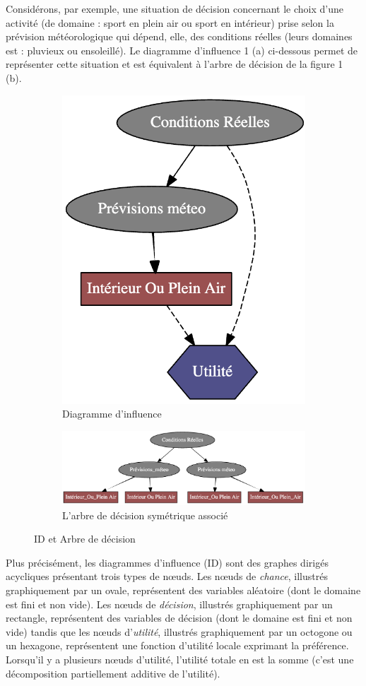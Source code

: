 \documentclass[12pt]{article}
\begin{document}
Considérons, par exemple, une situation de décision concernant le choix d'une activité (de domaine : sport en plein air ou sport en intérieur) prise selon la prévision météorologique qui dépend, elle, des conditions réelles (leurs domaines est : pluvieux ou ensoleillé). Le diagramme d'influence 1 (a) ci-dessous permet de représenter cette situation et est équivalent à l'arbre de décision de la figure 1 (b).

\begin{figure}[ht]
\centering
\begin{subfigure}{.5\textwidth}
  \centering
  \includegraphics[width=.5\linewidth]{docs/ressources_rapport/exempleID_SIMPLE.png}
  \caption{Diagramme d'influence}
  \label{fig:sub1}
\end{subfigure}%
\begin{subfigure}{.5\textwidth}
  \centering
  \includegraphics[width=1.2\linewidth]{docs/ressources_rapport/exempleArbreDecision.png}
  \caption{L'arbre de décision symétrique associé}
  \label{fig:sub2}
\end{subfigure}
\caption{ID et Arbre de décision}
\label{fig:test}
\end{figure}

Plus précisément, les diagrammes d'influence (ID) sont des graphes dirigés acycliques présentant trois types de nœuds. Les nœuds de \textit{chance}, illustrés graphiquement par un ovale, représentent des variables aléatoire (dont le domaine est fini et non vide). 
Les nœuds de \textit{décision}, illustrés graphiquement par un rectangle, représentent des variables de décision (dont le domaine est fini et non vide) tandis que les nœuds d'\textit{utilité}, illustrés graphiquement par un octogone ou un hexagone, représentent une fonction d'utilité locale exprimant la préférence.
Lorsqu'il y a plusieurs nœuds d'utilité, l'utilité totale en est la somme (c'est une décomposition partiellement additive de l'utilité).
\end{document}
